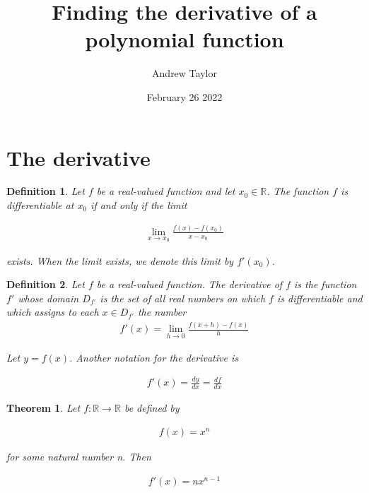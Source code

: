 \documentclass{article}
\title{Finding the derivative of a polynomial function}
\author{Andrew Taylor}
\date{February 26 2022}
\newtheorem{definition}{Definition}
\newtheorem{theorem}{Theorem}
\begin{document}
\maketitle
\section{The derivative}

\begin{definition}
Let $f$ be a real-valued function and let $x_{0} \in \mathbb{R}$. The function $f$ is differentiable at $x_{0}$ if and only if the limit

\begin{align*}
\lim_{x \to x_{0}} \frac{f(x) - f(x_{0})}{x - x_{0}}
\end{align*}

exists. When the limit exists, we denote this limit by $f'(x_{0})$.
\end{definition}

\begin{definition}
Let $f$ be a real-valued function. The derivative of $f$ is the function $f'$ whose domain $D_{f'}$ is the set of all real numbers on which $f$ is differentiable and which assigns to each $x \in D_{f'}$ the number
\begin{align*}
f'(x) = \lim_{h \to 0} \frac{f(x+h) - f(x)}{h}
\end{align*}

Let $y = f(x)$. Another notation for the derivative is

\begin{align*}
f'(x) = \frac{dy}{dx} = \frac{df}{dx}
\end{align*}
\end{definition}

\begin{theorem}
Let $f:\mathbb{R} \to \mathbb{R}$ be defined by 

\begin{align*}
f(x) = x^{n}
\end{align*} 

for some natural number n. Then

\begin{align*}
f'(x) = nx^{n-1}
\end{align*}
\end{theorem}
\end{document}
